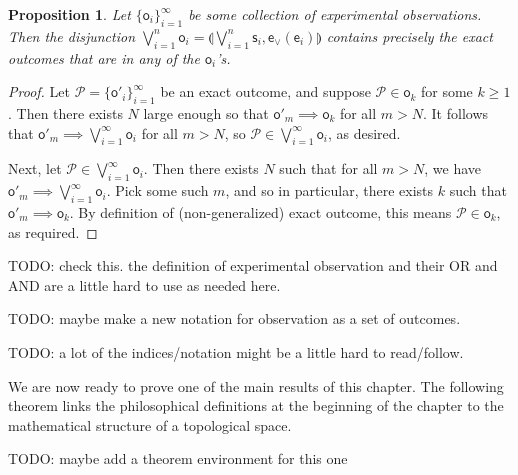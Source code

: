\documentclass[review]{elsarticle}
\theoremstyle{plain}%
\newtheorem{prop}[thm]{Proposition}
\theoremstyle{definition}
\theoremstyle{remark}
\begin{document}
\begin{prop}
Let $\{\mathsf{o}_i\}_{i=1}^{\infty}$ be some collection of experimental observations. Then the disjunction $\bigvee\limits_{i=1}^{n} \mathsf{o}_i = \llparenthesis\bigvee\limits_{i=1}^{n} \mathsf{s}_i, \mathsf{e}_{\vee}(\mathsf{e}_i)\rrparenthesis$ contains precisely the exact outcomes that are in any of the $\mathsf{o}_i$'s. 
\end{prop}
\begin{proof}
Let $\mathcal{P} = \{\mathsf{o}'_i\}_{i=1}^{\infty}$ be an exact outcome, and suppose $\mathcal{P}\in\mathsf{o}_k$ for some $k\geq1$. Then there exists $N$ large enough so that $\mathsf{o}'_m\implies\mathsf{o}_k$ for all $m>N$. It follows that $\mathsf{o}'_m\implies\bigvee\limits_{i=1}^{\infty} \mathsf{o}_i$ for all $m>N$, so $\mathcal{P}\in\bigvee\limits_{i=1}^{\infty} \mathsf{o}_i$, as desired. 

Next, let $\mathcal{P}\in\bigvee\limits_{i=1}^{\infty} \mathsf{o}_i$. Then there exists $N$ such that for all $m>N$, we have $\mathsf{o}'_m\implies \bigvee\limits_{i=1}^{\infty} \mathsf{o}_i$. Pick some such $m$, and so in particular, there exists $k$ such that $\mathsf{o}'_m\implies\mathsf{o}_k$. By definition of (non-generalized) exact outcome, this means $\mathcal{P}\in \mathsf{o}_k$, as required. 
\end{proof}


TODO: check this. the definition of experimental observation and their OR and AND are a little hard to use as needed here. 

TODO: maybe make a new notation for observation as a set of outcomes. 


TODO: a lot of the indices/notation might be a little hard to read/follow. 




We are now ready to prove one of the main results of this chapter. The following theorem links the philosophical definitions at the beginning of the chapter to the mathematical structure of a topological space.

TODO: maybe add a theorem environment for this one
\end{document}
